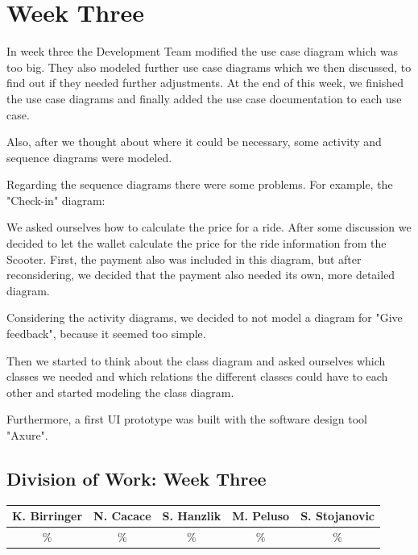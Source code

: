 \documentclass[a4paper, 12pt]{article}
\begin{document}
\section{Week Three}
In week three the Development Team modified the use case diagram which was too big. They also modeled further use case diagrams which we then discussed, to find out if they needed further adjustments. At the end of this week, we finished the use case diagrams and finally added the use case documentation to each use case.

Also, after we thought about where it could be necessary, some activity and sequence diagrams were modeled.

Regarding the sequence diagrams there were some problems.
For example, the "Check-in" diagram:

We asked ourselves how to calculate the price for a ride. After some discussion we decided to let the wallet calculate the price for the ride information from the Scooter.
First, the payment also was included in this diagram, but after reconsidering, we decided that the payment also needed its own, more detailed diagram.

Considering the activity diagrams, we decided to not model a diagram for "Give feedback", because it seemed too simple.

Then we started to think about the class diagram and asked ourselves which classes we needed and which relations the different classes could have to each other and started modeling the class diagram.

Furthermore, a first UI prototype was built with the software design tool "Axure".\cite{axure}

\subsection{Division of Work: Week Three}
\begin{table}[htbp]
\centering
\setlength{\tabcolsep}{10pt}
\begin{tabular}{|c|c|c|c|c|}
\hline
K. Birringer & N. Cacace & S. Hanzlik & M. Peluso & S. Stojanovic\\
\hline
\% & \% & \% & \% & \% \\ 
\hline
\end{tabular}
\end{table}
\end{document}

